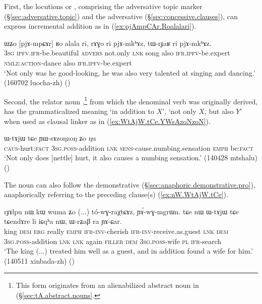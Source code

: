 First, the locutions  or , comprising the adversative topic marker  (§\ref{sec:adversative.topic}) and the adversative  (§\ref{sec:concessive.clauses}), can express incremental addition as in (\ref{ex:pjAmpCAr.Roalalari}).

\begin{exe}
\ex \label{ex:pjAmpCAr.Roalalari}
\gll ɯʑo [pjɤ-mpɕɤr] ʁo alala ri, rɤɣo ri pjɤ-mkʰɤz, tɯ-rɟaʁ ri pjɤ-mkʰɤz. \\
\textsc{3sg} \textsc{ipfv}.\textsc{ifr}-be.beautiful \textsc{advers} not.only \textsc{lnk} song also \textsc{ifr}.\textsc{ipfv}-be.expert \textsc{nmlz}:\textsc{action}-dance also \textsc{ifr}.\textsc{ipfv}-be.expert  \\
\glt `Not only was he good-looking, he was also very talented at singing and dancing.' (160702 luocha-zh)
()
\end{exe}

Second, the relator noun ,\footnote{This form originates from an alienabilized abstract noun in  (§\ref{sec:tA.abstract.nouns}.} from which the denominal verb  was originally derived, has the grammaticalized meaning `in addition to $X$', `not only $X$, but also $Y$' when used as clausal linker as in (\ref{ex:WtAjW.tCe.YWsAzoNzoN}).

\begin{exe}
\ex \label{ex:WtAjW.tCe.YWsAzoNzoN}
\gll  [ɕɯ-mŋɤm] ɯ-tɤjɯ tɕe ɲɯ-sɤzoŋzoŋ ʑo ŋu \\
\textsc{caus}-hurt:\textsc{fact} \textsc{3sg}.\textsc{poss}-addition \textsc{lnk} \textsc{sens}-cause.numbing.sensation \textsc{emph} be:\textsc{fact} \\
\glt `Not only does [nettle] hurt, it also causes a numbing sensation.' (140428 mtshalu)
()
\end{exe}

The noun  can also follow the demonstrative  (§\ref{sec:anaphoric.demonstrative.pro}), anaphorically referring to the preceding clause(s) (\ref{ex:nW.WtAjW.tCe}).

\begin{exe}
\ex \label{ex:nW.WtAjW.tCe}
\gll  rɟɤlpu nɯ kɯ wuma ʑo (...) tó-wɣ-raχtɕɤz, ɲɤ́-wɣ-mgrɯn. tɕe nɯ ɯ-tɤjɯ tɕe tɕendɤre li iɕqʰa nɯ, ɯ-rʑaβ ra ɲɤ-ɕar. \\
king \textsc{dem} \textsc{erg} really \textsc{emph} {  } \textsc{ifr}-\textsc{inv}-cherish \textsc{ifr}-\textsc{inv}-receive.as.guest \textsc{lnk} \textsc{dem} \textsc{3sg}.\textsc{poss}-addition \textsc{lnk} \textsc{lnk} again \textsc{filler} \textsc{dem} \textsc{3sg}.\textsc{poss}-wife \textsc{pl} \textsc{ifr}-search \\
\glt `The king (...) treated him well as a guest, and in addition found a wife for him.' (140511 xinbada-zh)
()
\end{exe}

